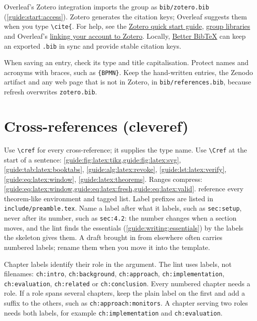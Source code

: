 Overleaf's Zotero integration imports the group as \texttt{bib/zotero.bib} (\cref{guide:start:access}). Zotero generates the citation keys; Overleaf suggests them when you type \texttt{\textbackslash cite\{}. For help, see the \href{https://www.zotero.org/support/quick_start_guide}{Zotero quick start guide}, \href{https://www.zotero.org/support/groups}{group libraries} and Overleaf's \href{https://www.overleaf.com/learn/how-to/How_to_link_your_Overleaf_account_to_Mendeley_and_Zotero}{linking your account to Zotero}. Locally, \href{https://retorque.re/zotero-better-bibtex/}{Better BibTeX} can keep an exported \texttt{.bib} in sync and provide stable citation keys.

When saving an entry, check its type and title capitalisation. Protect names and acronyms with braces, such as \texttt{\{BPMN\}}. Keep the hand-written entries, the Zenodo artifact and any web page that is not in Zotero, in \texttt{bib/references.bib}, because refresh overwrites \texttt{zotero.bib}.

\section{Cross-references (cleveref)}\label{guide:latex:cref}
Use \texttt{\textbackslash cref} for every cross-reference; it supplies the type name. Use \texttt{\textbackslash Cref} at the start of a sentence:
\cref{guide:fig:latex:tikz,guide:fig:latex:svg}, \cref{guide:tab:latex:booktabs}, \cref{guide:alg:latex:revoke}, \cref{guide:lst:latex:verify}, \cref{guide:eq:latex:window}, \cref{guide:latex:theorems}.
Ranges compress: \cref{guide:eq:latex:window,guide:eq:latex:fresh,guide:eq:latex:valid}.
 reference every theorem-like environment and tagged list.
Label prefixes are listed in \texttt{include/preamble.tex}.
Name a label after what it labels, such as \texttt{sec:setup}, never after its number, such as \texttt{sec:4.2}: the number changes when a section moves, and the lint finds the essentials (\cref{guide:writing:essentials}) by the labels the skeleton gives them. A draft brought in from elsewhere often carries numbered labels; rename them when you move it into the template.

Chapter labels identify their role in the argument. The lint uses labels, not filenames: \texttt{ch:intro}, \texttt{ch:background}, \texttt{ch:approach}, \texttt{ch:implementation}, \texttt{ch:evaluation}, \texttt{ch:related} or \texttt{ch:conclusion}. Every numbered chapter needs a role. If a role spans several chapters, keep the plain label on the first and add a suffix to the others, such as \texttt{ch:approach:monitors}. A chapter serving two roles needs both labels, for example \texttt{ch:implementation} and \texttt{ch:evaluation}.

